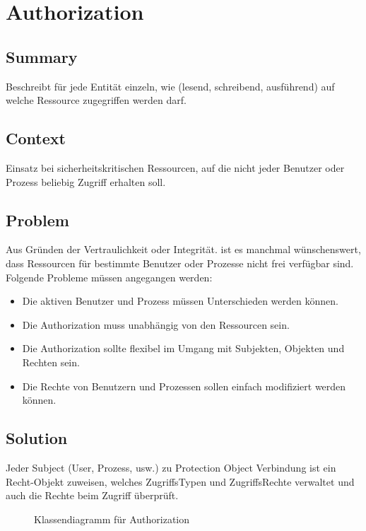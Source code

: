 \chapter{Authorization}

\section{Summary}
Beschreibt für jede Entität einzeln, wie (lesend, schreibend, ausführend) auf welche Ressource zugegriffen werden darf.

\section{Context}
Einsatz bei sicherheitskritischen Ressourcen, auf die nicht jeder Benutzer oder Prozess beliebig Zugriff erhalten soll.

\section{Problem}
Aus Gründen der Vertraulichkeit oder Integrität. ist es manchmal wünschenswert, dass Ressourcen für bestimmte Benutzer oder Prozesse nicht frei verfügbar sind. Folgende Probleme müssen angegangen werden:\\
\begin{itemize}{}{ }
  \item Die aktiven Benutzer und Prozess müssen Unterschieden werden können.
  \item Die Authorization muss unabhängig von den Ressourcen sein.
  \item Die Authorization sollte flexibel im Umgang mit Subjekten, Objekten und Rechten sein.
  \item Die Rechte von Benutzern und Prozessen sollen einfach modifiziert werden können.
\end{itemize}

\section{Solution}
Jeder Subject (User, Prozess, usw.) zu Protection Object Verbindung ist ein Recht-Objekt zuweisen, welches ZugriffsTypen und ZugriffsRechte verwaltet und auch die Rechte beim Zugriff überprüft.

\begin{figure}[!ht]
  \centering
  
  \caption{Klassendiagramm f\"ur Authorization}
\end{figure}

